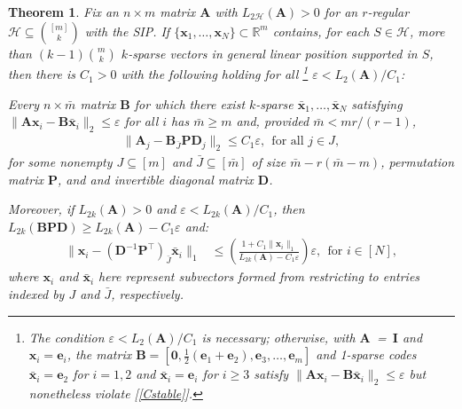 \documentclass[9pt,twocolumn]{pnas-new}
\newtheorem{theorem}{Theorem}
\renewcommand{\eqref}[1]{\textnormal{[\ref{#1}]}}
\begin{document}
\begin{theorem}\label{DeterministicUniquenessTheorem}
Fix an $n \times m$ matrix $\mathbf{A}$ with $L_{2\mathcal{H}}(\mathbf{A}) > 0$ for an $r$-regular $\mathcal{H} \subseteq {[m] \choose k}$ with the SIP. If \mbox{$\{\mathbf{x}_1, \ldots, \mathbf{x}_N\} \subset \mathbb{R}^m$} contains, for each $S \in \mathcal{H}$, more than $(k-1){m \choose k}$ $k$-sparse vectors in general linear position supported in $S$, then there is $C_1 > 0$ with the following holding for all%
\footnote{The condition $\varepsilon < L_2(\mathbf{A}) /C_1$ is necessary; otherwise, with \mbox{$\mathbf{A}$ = $\mathbf{I}$} and $\mathbf{x}_i = \mathbf{e}_i$, the matrix $\mathbf{B} = \left[\mathbf{0}, \frac{1}{2}(\mathbf{e}_1 + \mathbf{e}_2), \mathbf{e}_3, \ldots, \mathbf{e}_{m} \right]$ and 1-sparse codes $\mathbf{\bar x}_i = \mathbf{e}_2$ for $i = 1, 2$ and $\mathbf{\bar x}_i = \mathbf{e}_i$ for $i \geq 3$ satisfy $\|\mathbf{A}\mathbf{x}_i - \mathbf{B}\mathbf{\bar{x}}_i \|_2 \leq \varepsilon$ but nonetheless violate \eqref{Cstable}.} $\varepsilon < L_{2}(\mathbf{A}) / C_1$:

Every $n \times \bar m$ matrix $\mathbf{B}$ for which there exist $k$-sparse $\mathbf{\bar x}_1, \ldots, \mathbf{\bar x}_N$ satisfying \mbox{$\|\mathbf{A}\mathbf{x}_i - \mathbf{B}\mathbf{\bar x}_i\|_2 \leq \varepsilon$} for all $i$ has $\bar m \geq m$ and, provided $\bar m < mr/(r-1)$,
\begin{align}\label{Cstable}
\|\mathbf{A}_j- \mathbf{B}_{\bar J} \mathbf{PD}_j\|_2 \leq C_1 \varepsilon, \ \ \text{for all } j \in J,
\end{align}
%
for some nonempty $J \subseteq [m]$ and $\bar J \subseteq [\bar m]$ of size $\bar m - r(\bar m - m)$, permutation matrix $\mathbf{P}$, and and invertible diagonal matrix $\mathbf{D}$. 

Moreover, if $L_{2k}(\mathbf{A}) > 0$ and $\varepsilon < L_{2k}(\mathbf{A}) / C_1$, then $L_{2k}(\mathbf{B}\mathbf{PD}) \geq L_{2k}(\mathbf{A}) - C_1 \varepsilon$ and:
\begin{align}\label{b-PDa}
\|\mathbf{x}_i - \left(\mathbf{D}^{-1}\mathbf{P}^{\top}\right)_{\bar J}\mathbf{\bar x}_i\|_1 &\leq  \left( \frac{ 1+C_1 \|\mathbf{x}_i\|_1 }{ L_{2k}(\mathbf{A}) -  C_1\varepsilon } \right) \varepsilon, \ \  \text{for $i \in [N]$},
\end{align}
%
where $\mathbf{x}_i$ and $\mathbf{\bar x}_i$ here represent subvectors formed from restricting to entries indexed by $J$ and $\bar J$, respectively. 
\end{theorem}
\end{document}
